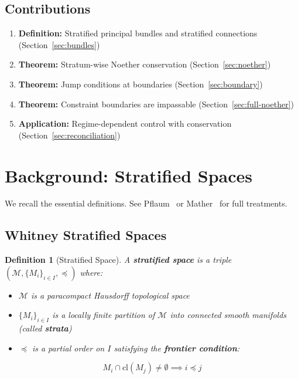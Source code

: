 \documentclass[11pt,a4paper]{article}
\newtheorem{definition}[theorem]{Definition}
\begin{document}
\subsection{Contributions}

\begin{enumerate}
    \item \textbf{Definition:} Stratified principal bundles and stratified connections (Section~\ref{sec:bundles})

    \item \textbf{Theorem:} Stratum-wise Noether conservation (Section~\ref{sec:noether})

    \item \textbf{Theorem:} Jump conditions at boundaries (Section~\ref{sec:boundary})

    \item \textbf{Theorem:} Constraint boundaries are impassable (Section~\ref{sec:full-noether})

    \item \textbf{Application:} Regime-dependent control with conservation (Section~\ref{sec:reconciliation})
\end{enumerate}

\section{Background: Stratified Spaces}\label{sec:background}

We recall the essential definitions. See Pflaum~\cite{pflaum} or Mather~\cite{mather} for full treatments.

\subsection{Whitney Stratified Spaces}

\begin{definition}[Stratified Space]
A \textbf{stratified space} is a triple $(\mathcal{M}, \{M_i\}_{i \in I}, \preceq)$ where:
\begin{itemize}
    \item $\mathcal{M}$ is a paracompact Hausdorff topological space
    \item $\{M_i\}_{i \in I}$ is a locally finite partition of $\mathcal{M}$ into connected smooth manifolds (called \textbf{strata})
    \item $\preceq$ is a partial order on $I$ satisfying the \textbf{frontier condition}:
\end{itemize}
\[
    M_i \cap \mathrm{cl}(M_j) \neq \emptyset \implies i \preceq j
\]
\end{definition}
\end{document}
